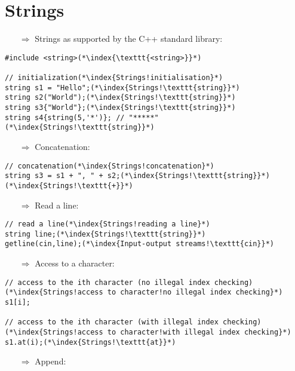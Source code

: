 \documentclass[10pt]{article}
\begin{document}
\section{Strings}
\small
\begin{enumerate}
\item[$\Rightarrow$] Strings as supported by the C++ standard library:
\end{enumerate}
\begin{lstlisting}
#include <string>(*\index{\texttt{<string>}}*)

// initialization(*\index{Strings!initialisation}*)
string s1 = "Hello";(*\index{Strings!\texttt{string}}*)
string s2("World");(*\index{Strings!\texttt{string}}*)
string s3{"World"};(*\index{Strings!\texttt{string}}*)
string s4{string(5,'*')}; // "*****"(*\index{Strings!\texttt{string}}*)
\end{lstlisting}
\begin{enumerate}
\item[$\Rightarrow$] Concatenation:
\end{enumerate}
\begin{lstlisting}
// concatenation(*\index{Strings!concatenation}*)
string s3 = s1 + ", " + s2;(*\index{Strings!\texttt{string}}*)(*\index{Strings!\texttt{+}}*)
\end{lstlisting}
\begin{enumerate}
\item[$\Rightarrow$] Read a line:
\end{enumerate}
\begin{lstlisting}
// read a line(*\index{Strings!reading a line}*)
string line;(*\index{Strings!\texttt{string}}*)
getline(cin,line);(*\index{Input-output streams!\texttt{cin}}*)
\end{lstlisting}
\begin{enumerate}
\item[$\Rightarrow$] Access to a character:
\end{enumerate}
\begin{lstlisting}
// access to the ith character (no illegal index checking)(*\index{Strings!access to character!no illegal index checking}*)
s1[i];

// access to the ith character (with illegal index checking)(*\index{Strings!access to character!with illegal index checking}*)
s1.at(i);(*\index{Strings!\texttt{at}}*)
\end{lstlisting}
\begin{enumerate}
\item[$\Rightarrow$] Append:
\end{enumerate}
\end{document}
